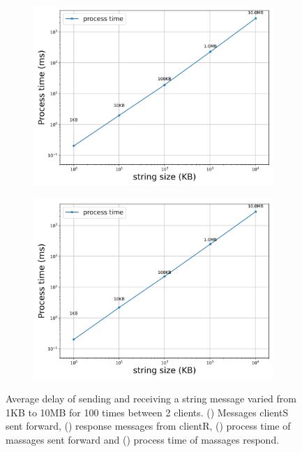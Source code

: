 \begin{figure}[htb]
    \begin{subfigure}{0.49\textwidth}
        \centering
        \includegraphics[width=\textwidth]{figures/tests/proportional_tests/Average_string_messages_sending_time_of_100_tests_1KB_to_10MB.png}
        \caption{} \label{fig: proportional-stringsize-a}
    \end{subfigure}
    \begin{subfigure}{0.49\textwidth}
        \centering
        \includegraphics[width=\textwidth]{figures/tests/proportional_tests/Average_string_messages_receiving_time_of_100_tests_1KB_to_10MB.png} 
        \caption{} \label{fig: proportional-stringsize-b}
    \end{subfigure} 

    \caption{Average delay of sending and receiving a string message varied from 1KB 
    to 10MB for 100 times between 2 clients. () Messages clientS sent forward, 
    () response messages from clientR, 
    () process time of massages sent forward 
    and () process time of massages respond. 
    \label{fig: proportional-stringsize}}
\end{figure}

